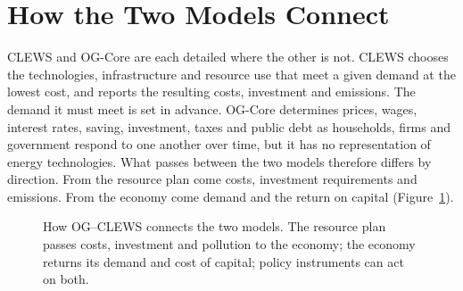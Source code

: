 \section{How the Two Models Connect}
\label{sec:connect}

CLEWS and OG-Core are each detailed where the other is not. CLEWS chooses the
technologies, infrastructure and resource use that meet a given demand at the lowest cost,
and reports the resulting costs, investment and emissions. The demand it must meet is set
in advance. OG-Core determines prices, wages, interest rates, saving, investment, taxes and
public debt as households, firms and government respond to one another over time, but it
has no representation of energy technologies. What passes between the two models therefore
differs by direction. From the resource plan come costs, investment requirements and
emissions. From the economy come demand and the return on capital
(Figure~\ref{fig:connect}).

\begin{figure}[H]
\centering
{}
\caption{How OG--CLEWS connects the two models. The resource plan passes costs, investment
and pollution to the economy; the economy returns its demand and cost of capital; policy
instruments can act on both.}
\label{fig:connect}
\end{figure}

